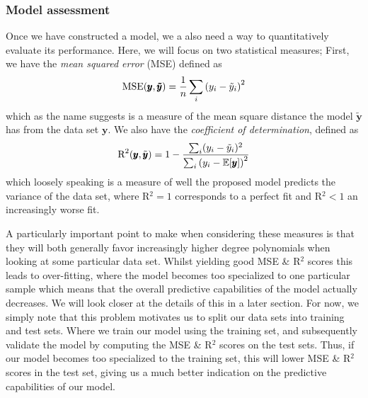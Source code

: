 \documentclass[reprint, english, nofootinbib]{revtex4-2}
\begin{document}
        \subsubsection{Model assessment}
            \noindent
            Once we have constructed a model, we a also need a way to quantitatively evaluate its performance. Here, we will focus on two statistical measures; First, we have the \textit{mean squared error} (MSE) defined as
            \begin{equation}
                \textup{MSE}(\pmb y, \pmb{\tilde y}) = \frac{1}{n}\sum_i \qty(y_i - \tilde y_i)^2
            \end{equation}
            which as the name suggests is a measure of the mean square distance the model $\pmb{\tilde y}$ has from the data set $\pmb y$. We also have the \textit{coefficient of determination}, defined as
            \begin{equation}
                \textup{R}^2(\pmb y, \tilde{\pmb{y}}) = 1 -
                \frac{\sum_i(y_i - \tilde y_i)^2}{\sum_i \qty(y_i - \mathbb E\qty[\pmb y])^2}
            \end{equation}
            which loosely speaking is a measure of well the proposed model predicts the variance of the data set, where R$^2 = 1$ corresponds to a perfect fit and R$^2 < 1$ an increasingly worse fit.

            A particularly important point to make when considering these measures is that they will both generally favor increasingly higher degree polynomials when looking at some particular data set. Whilst yielding good MSE \& R$^2$ scores this leads to over-fitting, where the model becomes too specialized to one particular sample which means that the overall predictive capabilities of the model actually decreases. We will look closer at the details of this in a later section. For now, we simply note that this problem motivates us to split our data sets into training and test sets. Where we train our model using the training set, and subsequently validate the model by computing the MSE \& R$^2$ scores on the test sets. Thus, if our model becomes too specialized to the training set, this will lower MSE \& R$^2$ scores in the test set, giving us a much better indication on the predictive capabilities of our model.
\end{document}
